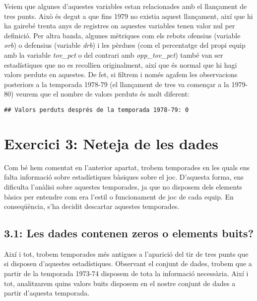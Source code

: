 \documentclass[
]{article}
\begin{document}
Veiem que algunes d'aquestes variables estan relacionades amb el
llançament de tres punts. Això és degut a que fins 1979 no existia
aquest llançament, així que hi ha gairebé trenta anys de registres on
aquestes variables tenen valor nul per definició. Per altra banda,
algunes mètriques com els rebots ofensius (variable \emph{orb}) o
defensius (variable \emph{drb}) i les pèrdues (com el percentatge del
propi equip amb la variable \emph{tov\_pct} o del contrari amb
\emph{opp\_tov\_pct}) també van ser estadístiques que no es recollien
originalment, així que és normal que hi hagi valors perduts en aquestes.
De fet, si filtrem i només agafem les observacions posteriors a la
temporada 1978-79 (el llançament de tres va començar a la 1979-80)
veurem que el nombre de valors perduts és molt diferent:

\begin{verbatim}
## Valors perduts després de la temporada 1978-79: 0
\end{verbatim}

\hypertarget{exercici-3-neteja-de-les-dades}{%
\section{Exercici 3: Neteja de les
dades}\label{exercici-3-neteja-de-les-dades}}

Com bé hem comentat en l'anterior apartat, trobem temporades en les
quals ens falta informació sobre estadístiques bàsiques sobre el joc.
D'aquesta forma, ens dificulta l'anàlisi sobre aquestes temporades, ja
que no disposem dels elements bàsics per entendre com era l'estil o
funcionament de joc de cada equip. En conseqüència, s'ha decidit
descartar aquestes temporades.

\hypertarget{les-dades-contenen-zeros-o-elements-buits}{%
\subsection{3.1: Les dades contenen zeros o elements
buits?}\label{les-dades-contenen-zeros-o-elements-buits}}

Així i tot, trobem temporades més antigues a l'aparició del tir de tres
punts que si disposen d'aquestes estadístiques. Observant el conjunt de
dades, trobem que a partir de la temporada 1973-74 disposem de tota la
informació necessària. Així i tot, analitzarem quins valors buits
disposem en el nostre conjunt de dades a partir d'aquesta temporada.
\end{document}
